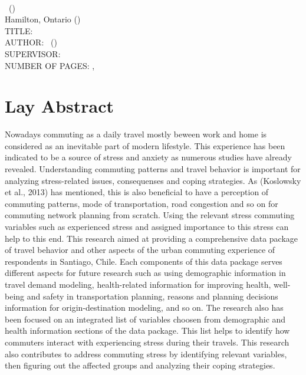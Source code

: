 \documentclass[
11pt, %
oneside, %
english, %
singlespacing, %
]{macthesis} %
\begin{document}
\noindent %
\univname \\
\degreename\, (\the\year) \\
Hamilton, Ontario (\deptname) \\[1.5cm]
TITLE: \ttitle \\
AUTHOR: \authorname\,  %
(\univname)  \\
SUPERVISOR: \supname\, \\
NUMBER OF PAGES: \pageref{lastoffront}, \pageref{LastPage}  %

\clearpage

\section*{Lay Abstract}
  Nowadays commuting as a daily travel mostly beween work and home is considered as an inevitable part of modern lifestyle. This experience has been indicated to be a source of stress and anxiety as numerous studies have already revealed. Understanding commuting patterns and travel behavior is important for analyzing stress-related issues, consequenses and coping strategies. As (Koslowsky et al., 2013) has mentioned, this is also beneficial to have a perception of commuting patterns, mode of transportation, road congestion and so on for commuting network planning from scratch. Using the relevant stress commuting variables such as experienced stress and assigned importance to this stress can help to this end.
  This research aimed at providing a comprehensive data package of travel behavior and other aspects of the urban commuting experience of respondents in Santiago, Chile. Each components of this data package serves different aspects for future research such as using demographic information in travel demand modeling, health-related information for improving health, well-being and safety in transportation planning, reasons and planning decisions information for origin-destination modeling, and so on.
  The research also has been focused on an integrated list of variables choosen from demographic and health information sections of the data package. This list helps to identify how commuters interact with experiencing stress during their travels. This research also contributes to address commuting stress by identifying relevant variables, then figuring out the affected groups and analyzing their coping strategies.
\clearpage
\end{document}
